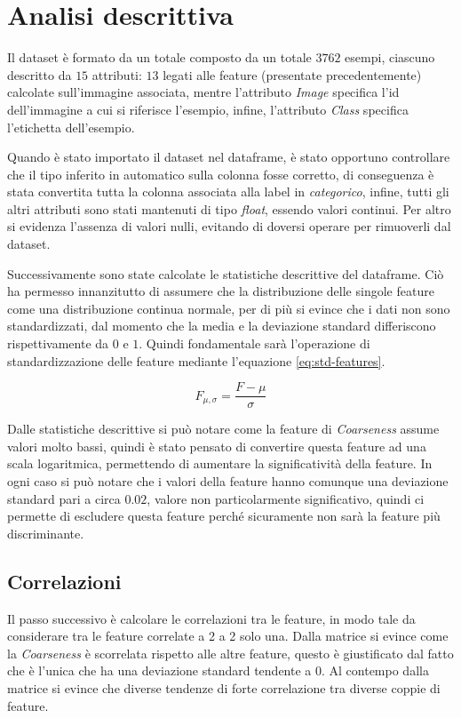 \section{Analisi descrittiva}
Il dataset è formato da un totale composto da un totale $3762$ esempi, ciascuno
descritto da $15$ attributi: $13$ legati alle feature (presentate precedentemente) 
calcolate sull'immagine associata, mentre l'attributo \textit{Image} specifica l'id
dell'immagine a cui si riferisce l'esempio, infine, l'attributo \textit{Class}
specifica l'etichetta dell'esempio.

Quando è stato importato il dataset nel dataframe, è stato opportuno controllare che il tipo
inferito in automatico sulla colonna fosse corretto, di conseguenza è stata convertita
tutta la colonna associata alla label in \textit{categorico}, infine, tutti gli altri attributi sono
stati mantenuti di tipo \textit{float}, essendo valori continui. Per altro si evidenza
l'assenza di valori nulli, evitando di doversi operare per rimuoverli dal dataset.

Successivamente sono state calcolate le statistiche descrittive del dataframe. Ciò
ha permesso innanzitutto di assumere che la distribuzione delle singole feature
come una distribuzione continua normale, per di più si evince che i dati non sono
standardizzati, dal momento che la media e la deviazione standard differiscono rispettivamente
da $0$ e $1$. Quindi fondamentale sarà l'operazione di standardizzazione delle feature
mediante l'equazione \ref{eq:std-features}.

\begin{equation}
    F_{\mu, \sigma} = \frac{F - \mu}{\sigma}
    \label{eq:std-features}
\end{equation}

Dalle statistiche descrittive si può notare come la feature di \textit{Coarseness}
assume valori molto bassi, quindi è stato pensato di convertire questa feature ad una
scala logaritmica, permettendo di aumentare la significatività della feature. In 
ogni caso si può notare che i valori della feature hanno comunque una deviazione standard
pari a circa $0.02$, valore non particolarmente significativo, quindi ci permette
di escludere questa feature perché sicuramente non sarà la feature più discriminante.

\subsection{Correlazioni}
Il passo successivo è calcolare le correlazioni tra le feature, in modo tale da
considerare tra le feature correlate a 2 a 2 solo una. Dalla matrice si evince
come la \textit{Coarseness} è scorrelata rispetto alle altre feature, questo è
giustificato dal fatto che è l'unica che ha una deviazione standard tendente a 0.
Al contempo dalla matrice si evince che diverse tendenze di forte correlazione tra
diverse coppie di feature. 


